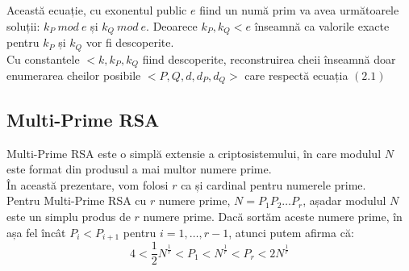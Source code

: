 \documentclass[12pt, oneside]{book}
\begin{document}
Această ecuație, cu exonentul public $e$ fiind un numă prim va avea următoarele soluții: $k_P \ mod \ e$ și $k_Q \ mod \ e$. Deoarece $k_P,k_Q <e$ înseamnă ca valorile exacte pentru $k_P$ și $k_Q$ vor fi descoperite. \\
Cu constantele $<k,k_P,k_Q$ fiind descoperite, reconstruirea cheii înseamnă doar enumerarea cheilor posibile $<P,Q,d,d_P,d_Q>$ care respectă ecuația $(2.1)$


\subsection{Multi-Prime RSA}
Multi-Prime RSA este o simplă extensie a criptosistemului, în care modulul $N$ este format din produsul a mai multor numere prime. \\
În această prezentare, vom folosi $r$ ca și cardinal pentru numerele prime.\\
Pentru Multi-Prime RSA cu $r$ numere prime, $N=P_1 P_2 \dots P_r$, așadar modulul $N$ este un simplu produs de $r$ numere prime. Dacă sortăm aceste numere prime, în așa fel încât $P_i < P_{i+1}$ pentru $i=1, \dots, r-1$, atunci putem afirma că:
\begin{equation}
4<\frac{1}{2}N^{\frac{1}{r}}<P_1<N^{\frac{1}{r}}<P_r <2N^{\frac{1}{r}}
\end{equation}
\end{document}

